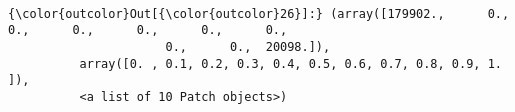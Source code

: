 \documentclass[11pt]{article}
\begin{document}
    \begin{center}
    \end{center}
    { \hspace*{\fill} \\}
    
\begin{Verbatim}[commandchars=\\\{\}]
{\color{outcolor}Out[{\color{outcolor}26}]:} (array([179902.,      0.,      0.,      0.,      0.,      0.,      0.,
                      0.,      0.,  20098.]),
          array([0. , 0.1, 0.2, 0.3, 0.4, 0.5, 0.6, 0.7, 0.8, 0.9, 1. ]),
          <a list of 10 Patch objects>)
\end{Verbatim}
            
    \begin{center}
    \end{center}
    { \hspace*{\fill} \\}
    

    
    
    
    
\end{document}
